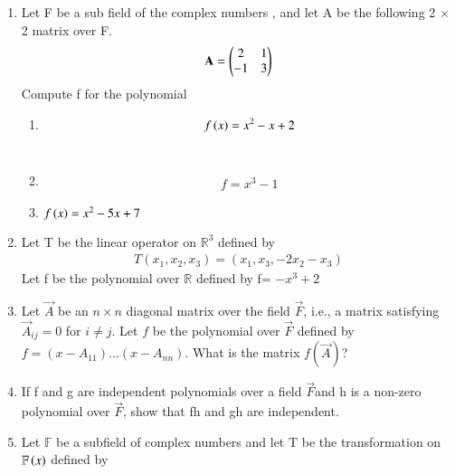 \renewcommand{\theequation}{\theenumi}
\renewcommand{\thefigure}{\theenumi}
\begin{enumerate}[label=\thesubsection.\arabic*.,ref=\thesubsection.\theenumi]

\item Let F be a sub field of the complex numbers , and let A be the following 2 $\times$ 2 matrix over F.
\begin{align}
  \mathbf{A}=\begin{pmatrix}2&1\\-1&3\end{pmatrix}  
\end{align}
Compute f for the polynomial
\begin{enumerate}
\item 
\begin{align}
    f\left(x\right)=x^{2}-x+2
\end{align}
%
\\
\solution

\item
\begin{align}
f = x^3 - 1
\end{align}
\solution

%
\item 
$f\left(x\right)=x^{2}-5x+7$
%
\\
\solution

\end{enumerate}
\item Let T be the linear operator on $\mathbb{R}^3$ defined by
\begin{align}
T(x_1,x_2,x_3)=(x_1,x_3,-2x_2-x_3)
\end{align}
Let f be the polynomial over $\mathbb{R}$ defined by f= $-x^3+2$
%
\\
\solution

\item Let $\vec{A}$ be an $n \times n$ diagonal matrix over the field $\vec{F}$, i.e., a matrix satisfying $\vec{A}_{ij} = 0$ for $i \neq j$. Let $f$ be the polynomial over $\vec{F}$ defined by $f = (x - A_{11}) . . . (x - A_{nn})$. What is the matrix $f(\vec{A})$? 
%
\\
\solution

\item If f  and g are independent polynomials over a field $\vec{F}$and h is a non-zero
polynomial over $\vec{F}$, show that fh and gh are independent.
%
\\
\solution

\item Let $\mathbb{F}$ be a subfield of complex numbers and let T be the transformation on $\mathbb{F}\left(x\right)$ defined by

\end{enumerate}
